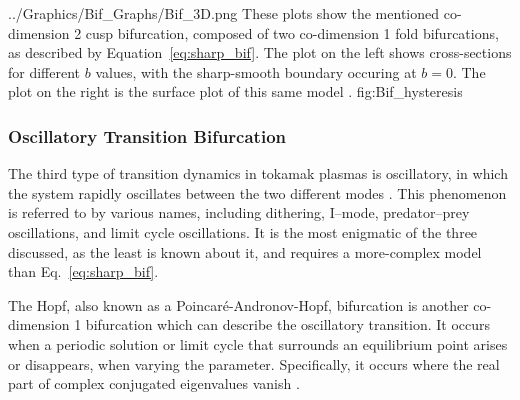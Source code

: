 	{../Graphics/Bif_Graphs/Bif_3D.png}
	{These plots show the mentioned co-dimension 2 cusp bifurcation, composed of two co-dimension 1 fold bifurcations, as described by Equation~\ref{eq:sharp_bif}.
	The plot on the left shows cross-sections for different $b$ values, with the sharp-smooth boundary occuring at $b = 0$.
	The plot on the right is the surface plot of this same model \cite{weymiens_bifurcation_2014}.}
	{fig:Bif_hysteresis}

\subsubsection{Oscillatory Transition Bifurcation}
The third type of transition dynamics in tokamak plasmas is oscillatory, in which the system rapidly oscillates between the two different modes \cite{ryter_survey_2013, zohm_mhd_1995}.
This phenomenon is referred to by various names, including dithering, I--mode, predator--prey oscillations, and limit cycle oscillations.
It is the most enigmatic of the three discussed, as the least is known about it, and requires a more-complex model than Eq.~\ref{eq:sharp_bif}.

The Hopf, also known as a Poincar\'e-Andronov-Hopf, bifurcation is another co-dimension 1 bifurcation which can describe the oscillatory transition.
It occurs when a periodic solution or limit cycle that surrounds an equilibrium point arises or disappears, when varying the parameter.
Specifically, it occurs where the real part of complex conjugated eigenvalues vanish \cite{munoz-alicea_introduction_2011}.


